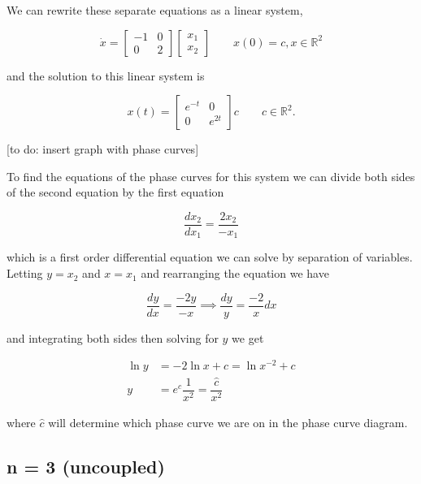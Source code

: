 \documentclass[12pt]{article}
\theoremstyle{definition}
\begin{document}
We can rewrite these separate equations as a linear system,

\begin{equation*}
\dot x =
\begin{bmatrix}
-1 & 0 \\
0 & 2
\end{bmatrix}
\begin{bmatrix}
x_1 \\
x_2
\end{bmatrix}
\quad\quad x(0) = c, x \in \mathbb{R}^2
\end{equation*}

and the solution to this linear system is

\begin{equation*}
x(t) =
\begin{bmatrix}
e^{-t} & 0 \\
0 & e^{2t}
\end{bmatrix}
c
\quad\quad c \in \mathbb{R}^2.
\end{equation*}

[to do: insert graph with phase curves]

To find the equations of the phase curves for this system we can divide both sides of the second equation by the first equation

\begin{equation*}
\dfrac{dx_2}{dx_1} = \dfrac{2x_2}{-x_1}
\end{equation*}

which is a first order differential equation we can solve by separation of variables. Letting $y = x_2$ and $x = x_1$ and rearranging the equation we have

\begin{equation*}
\dfrac{dy}{dx} = \dfrac{-2y}{-x} \implies \dfrac{dy}{y} = \dfrac{-2}{x}dx
\end{equation*}

and integrating both sides then solving for $y$ we get

\begin{equation*}
\begin{split}
\ln y &= -2 \ln x + c = \ln x^{-2} + c \\
y &= e^c \dfrac{1}{x^2} = \dfrac{\hat c}{x^2}
\end{split}
\end{equation*}

where $\hat c$ will determine which phase curve we are on in the phase curve diagram.


\subsection{n = 3 (uncoupled)}
\end{document}
